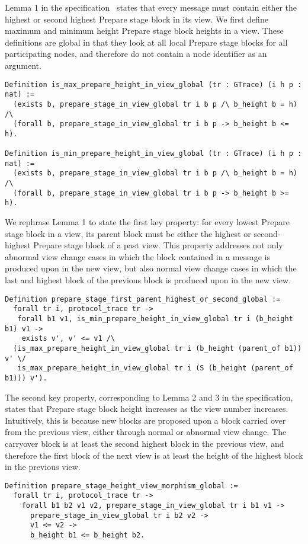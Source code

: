 \documentclass{easychair}
\begin{document}
Lemma 1 in the specification~\cite{GiskardSpec} states that every  message must contain either the highest or second highest Prepare stage block in its view. We first define maximum and minimum height Prepare stage block heights in a view. These definitions are global in that they look at all local Prepare stage blocks for all participating nodes, and therefore do not contain a node identifier  as an argument. 

\begin{lstlisting}[language=Coq]
Definition is_max_prepare_height_in_view_global (tr : GTrace) (i h p : nat) :=
  (exists b, prepare_stage_in_view_global tr i b p /\ b_height b = h) /\
  (forall b, prepare_stage_in_view_global tr i b p -> b_height b <= h).

Definition is_min_prepare_height_in_view_global (tr : GTrace) (i h p : nat) :=
  (exists b, prepare_stage_in_view_global tr i b p /\ b_height b = h) /\
  (forall b, prepare_stage_in_view_global tr i b p -> b_height b >= h).
\end{lstlisting}

\noindent
We rephrase Lemma 1 to state the first key property: for every lowest Prepare stage block in a view, its parent block must be either the highest or second-highest Prepare stage block of a past view. This property addresses not only abnormal view change cases in which the block contained in a  message is produced upon in the new view, but also normal view change cases in which the last and highest block of the previous block is produced upon in the new view. 
\begin{lstlisting}
Definition prepare_stage_first_parent_highest_or_second_global :=
  forall tr i, protocol_trace tr ->
   forall b1 v1, is_min_prepare_height_in_view_global tr i (b_height b1) v1 ->
    exists v', v' <= v1 /\
  (is_max_prepare_height_in_view_global tr i (b_height (parent_of b1)) v' \/
   is_max_prepare_height_in_view_global tr i (S (b_height (parent_of b1))) v').
\end{lstlisting}

\noindent
The second key property, corresponding to Lemma 2 and 3 in the specification, states that Prepare stage block height increases as the view number increases. Intuitively, this is because new blocks are proposed upon a block carried over from the previous view, either through normal or abnormal view change. The carryover block is at least the second highest block in the previous view, and therefore the first block of the next view is at least the height of the highest block in the previous view.
\begin{lstlisting}[language=Coq]
Definition prepare_stage_height_view_morphism_global :=
  forall tr i, protocol_trace tr ->
    forall b1 b2 v1 v2, prepare_stage_in_view_global tr i b1 v1 ->
      prepare_stage_in_view_global tr i b2 v2 ->
      v1 <= v2 ->
      b_height b1 <= b_height b2.
\end{lstlisting}
\end{document}
